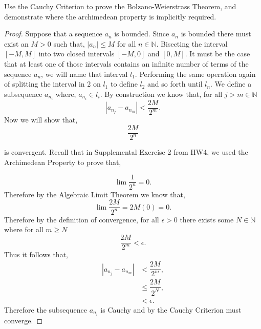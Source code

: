 \documentclass[12pt]{article}
\makeatletter
\theoremstyle{homework}
\newenvironment{exercise}[1]
{\def\@currentlabel{#1}\exercisecore}
{\endexercisecore}
\newcommand{\Nats}{\ensuremath{\mathbb N}}
\makeatother
\begin{document}
\begin{exercise}{2.6.7 (b)} Use the Cauchy Criterion to prove the Bolzano-Weierstrass Theorem, and
	demonstrate where the archimedean property is implicitly required. \\
	
	\begin{proof}
		Suppose that a sequence $a_n$ is bounded. Since $a_n$ is bounded there must exist an $M>0$ such that, 
		$|a_n|\le M$ for all $n \in \Nats$. Bisecting the interval $[-M,M]$ into two closed intervals $[-M,0]$ and $[0,M]$. It must
		be the case that at least one of those intervals contains an infinite number of terms of the sequence $a_n$, we will name that interval $l_1$. Performing the same operation again of
		splitting the interval in 2 on $l_1$ to define $l_2$ and so forth until $l_n$. We define a subsequence $a_{{n}_i}$ where, $a_{n_{i}} \in l_i$. By construction we know that, for all $j>m\in \Nats$
		\begin{equation*}
			|a_{{n}_j} - a_{{n}_m}|<\dfrac{2M}{2^{m}}.
		\end{equation*} 
		Now we will show that,
		\begin{equation*}
		 \dfrac{2M}{2^{n}}
		\end{equation*}

		is convergent. Recall that in Supplemental Exercise 2 from HW4, we used the Archimedean Property to prove that,

		\begin{equation*}
			\lim \dfrac{1}{2^{n}} = 0.
		\end{equation*}
		Therefore by the Algebraic Limit Theorem we know that,
		\begin{equation*}
			\lim \dfrac{2M}{2^{n}} = 2M(0) = 0.
		\end{equation*}
		Therefore by the definition of convergence, for all $\epsilon > 0$ there exists some $N \in \Nats$ where for all $m \geq N$
	\begin{equation*}
		\dfrac{2M}{2^{m}} < \epsilon.
	\end{equation*}
	Thus it follows that, 
	\begin{align*}
			|a_{n_{j}} - a_{n_{m}}| &< \dfrac{2M}{2^{m}},\\
			&\le \dfrac{2M}{2^{N}},\\
			&<\epsilon.
		\end{align*}
Therefore the subsequence $a_{n_{i}}$ is Cauchy and by the Cauchy Criterion must converge. 
	\end{proof}
\end{exercise}
\end{document}
